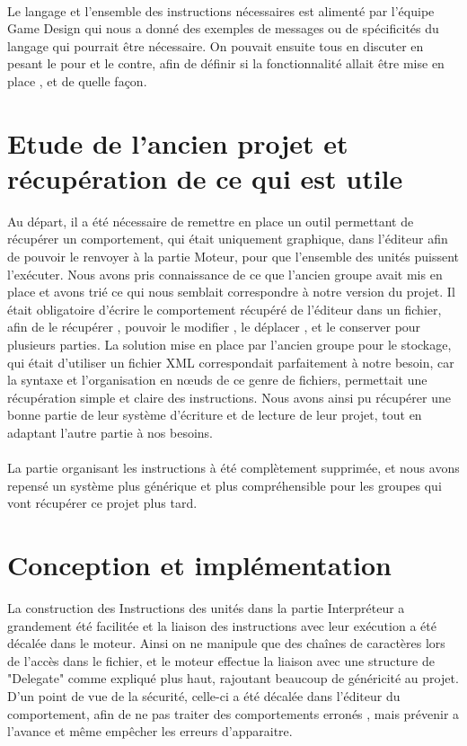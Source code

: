 \documentclass{report}
\begin{document}
\paragraph{}
Le langage et l'ensemble des instructions nécessaires est alimenté par l'équipe Game Design qui nous a donné des exemples de messages ou de spécificités du langage qui pourrait être nécessaire. On pouvait ensuite tous en discuter en pesant le pour et le contre, afin de définir si la fonctionnalité allait être mise en place , et de quelle façon.
\section{Etude de l'ancien projet et récupération de ce qui est utile}
Au départ, il a été nécessaire de remettre en place un outil permettant de récupérer un comportement, qui était uniquement graphique, dans l'éditeur afin de pouvoir le renvoyer à la partie Moteur, pour que l'ensemble des unités puissent l'exécuter.
Nous avons pris connaissance de ce que l'ancien groupe avait mis en place et avons trié ce qui nous semblait correspondre à notre version du projet.
Il était obligatoire d'écrire le comportement récupéré de l'éditeur dans un fichier, afin de le récupérer , pouvoir le modifier , le déplacer , et le conserver pour plusieurs parties.
La solution mise en place par l'ancien groupe pour le stockage, qui était d'utiliser un fichier XML correspondait parfaitement à notre besoin, car la syntaxe et l'organisation en nœuds de ce genre de fichiers, permettait une récupération simple et claire des instructions. Nous avons ainsi pu récupérer une bonne partie de leur système d'écriture et de lecture de leur projet, tout en adaptant l'autre partie à nos besoins.
\paragraph{}
\newpage
La partie organisant les instructions à été complètement supprimée, et nous avons repensé un système plus générique et plus compréhensible pour les groupes qui vont récupérer ce projet plus tard.
\section{Conception et implémentation}
La construction des Instructions des unités dans la partie Interpréteur a grandement été facilitée et la liaison des instructions avec leur exécution a été décalée dans le moteur. Ainsi on ne manipule que des chaînes de caractères lors de l'accès dans le fichier, et le moteur effectue la liaison avec une structure de "Delegate" comme expliqué plus haut, rajoutant beaucoup de généricité au projet.
D'un point de vue de la sécurité, celle-ci a été décalée dans l'éditeur du comportement, afin de ne pas traiter des comportements erronés , mais prévenir a l'avance et même empêcher les erreurs d'apparaitre.
\end{document}
